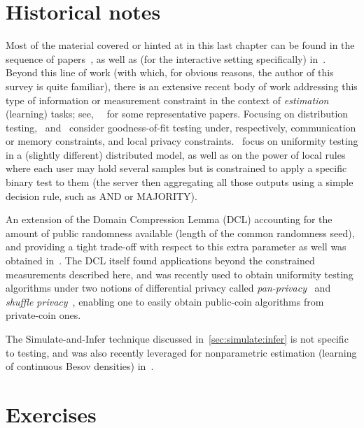 \section{Historical notes}
  \label{sec:constrained:notes}
Most of the material covered or hinted at in this last chapter can be found in the sequence of papers~\citet{AcharyaCT:IT1,AcharyaCT19b,AcharyaCFST21}, as well as (for the interactive setting specifically) in~\citet{AcharyaCLST21,AcharyaCST20}. Beyond this line of work (with which, for obvious reasons, the author of this survey is quite familiar), there is an extensive recent body of work addressing this type of information or measurement constraint in the context of \emph{estimation} (learning) tasks; see,~\eg~\citet{ZhangDJW13,GargMN14,Shamir14,BravermanGMNW16,YeB18,DuchiJW18,AcharyaSZ19,DuchR19,ButuceaDKS20,BarnesHO20} for some representative papers. Focusing on distribution testing,~\citet{DiakonikolasGKR19} and~\citet{AminJM20,BerrettB20} consider goodness-of-fit testing under, respectively, communication or memory constraints, and local privacy constraints.~\citet{FischerMO18,MeirMO19} focus on uniformity testing in a (slightly different) distributed model, as well as on the power of local rules where each user may hold several samples but is constrained to apply a specific binary test to them (the server then aggregating all those outputs using a simple decision rule, such as \textsf{AND} or \textsf{MAJORITY}). 

An extension of the Domain Compression Lemma (DCL) accounting for the amount of public randomness available (length of the common randomness seed), and providing a tight trade-off with respect to this extra parameter as well was obtained in~\citet{AcharyaCHST20}. The DCL itself found applications beyond the constrained measurements described here, and was recently used to obtain uniformity testing algorithms under two notions of differential privacy called \emph{pan-privacy}~\citep{AminJM20} and \emph{shuffle privacy}~\citep{BalcerCJM21,CL:22}, enabling one to easily obtain public-coin algorithms from private-coin ones.

The Simulate-and-Infer technique discussed in~\cref{sec:simulate:infer} is not specific to testing, and was also recently leveraged for nonparametric estimation (\ie learning of continuous Besov densities) in~\citet{ACST:21b}.
\section{Exercises}

